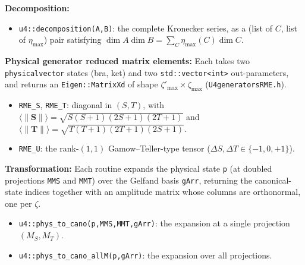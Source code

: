 \documentclass[aps,onecolumn,10pt,superscriptaddress,floatfix,nofootinbib]{revtex4}
\begin{document}
\textbf{Decomposition:}
\begin{itemize}
    \item \verb|u4::decomposition(A,B)|: the complete Kronecker series, as a (list of $C$, list of $\eta_{\max}$) pair satisfying $\dim A\dim B=\sum_C\eta_{\max}(C)\dim C$.
\end{itemize}

\textbf{Physical generator reduced matrix elements:} Each takes two
\verb|physicalvector| states (bra, ket) and two \verb|std::vector<int>|
out-parameters, and returns an \verb|Eigen::MatrixXd| of shape
$\zeta'_{\max}\times\zeta_{\max}$ (\verb|U4generatorsRME.h|).
\begin{itemize}
    \item \verb|RME_S|, \verb|RME_T|: diagonal in $(S,T)$, with $\langle\|\mathbf{S}\|\rangle=\sqrt{S(S{+}1)(2S{+}1)(2T{+}1)}$ and $\langle\|\mathbf{T}\|\rangle=\sqrt{T(T{+}1)(2T{+}1)(2S{+}1)}$.
    \item \verb|RME_U|: the rank-$(1,1)$ Gamow--Teller-type tensor ($\Delta S,\Delta T\in\{-1,0,+1\}$).
\end{itemize}

\textbf{Transformation:} Each routine expands the physical state \verb|p| (at
doubled projections \texttt{MMS} and \texttt{MMT}) over the Gelfand basis \verb|gArr|, returning the
canonical-state indices together with an amplitude matrix whose columns are
orthonormal, one per $\zeta$.
\begin{itemize}
    \item \verb|u4::phys_to_cano(p,MMS,MMT,gArr)|: the expansion at a single projection $(M_S,M_T)$.
    \item \verb|u4::phys_to_cano_allM(p,gArr)|: the expansion over all projections.
\end{itemize}
\end{document}
